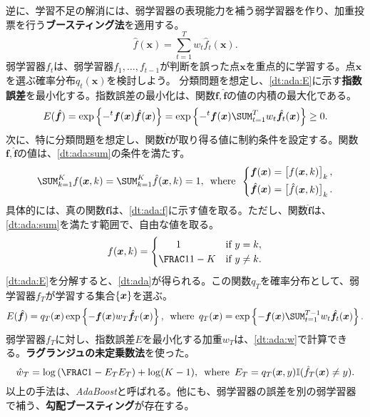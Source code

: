 \documentclass[10pt,a4paper]{book}
\begin{document}
逆に、学習不足の解消には、弱学習器の表現能力を補う弱学習器を作り、加重投票を行う\textbf{ブースティング法}を適用する。
%
\begin{equation}
\hat{f}(\bm{x}) = \sum_{t=1}^T w_t \hat{f}_t(\bm{x}).
\end{equation}
%
弱学習器$f_t$は、弱学習器$f_1,\ldots,f_{t-1}$が判断を誤った点$\bm{x}$を重点的に学習する。点$\bm{x}$を選ぶ確率分布$q_t(\bm{x})$を検討しよう。
分類問題を想定し、\eqref{dt:ada:E}に示す\textbf{指数誤差}を最小化する。指数誤差の最小化は、関数$\bm{f},\hat{\bm{f}}$の値の内積の最大化である。
%
\begin{equation}
\label{eq:dt:ada:E}
E(\hat{\bm{f}}) =
\exp \seq{-\trans{\bm{f}(\bm{x})} \hat{\bm{f}}(\bm{x})} =
\exp \seq{-\trans{\bm{f}(\bm{x})} \sum_{t=1}^T w_t \hat{\bm{f}}_t(\bm{x})} \geq 0.
\end{equation}
%
次に、特に分類問題を想定し、関数$\hat{\bm{f}}$が取り得る値に制約条件を設定する。関数$\bm{f},\hat{\bm{f}}$の値は、\eqref{dt:ada:sum}の条件を満たす。
%
\begin{equation}
\label{eq:dt:ada:sum}
\sum_{k=1}^K f(\bm{x},k) =
\sum_{k=1}^K \hat{f}(\bm{x},k) = 1,
\where
\left\{
\begin{aligned}
\bm{f}(\bm{x}) =
\begin{bmatrix}
f(\bm{x},k)
\end{bmatrix}_k,\\
\hat{\bm{f}}(\bm{x}) =
\begin{bmatrix}
\hat{f}(\bm{x},k)
\end{bmatrix}_k.
\end{aligned}
\right.
\end{equation}
%
具体的には、真の関数$\bm{f}$は、\eqref{dt:ada:f}に示す値を取る。ただし、関数$\hat{\bm{f}}$は、\eqref{dt:ada:sum}を満たす範囲で、自由な値を取る。
%
\begin{equation}
\label{eq:dt:ada:f}
f(\bm{x},k) =
\begin{cases}
\hfil1\hfil& \text{if $y=k$},\\
\frac{1}{1-K}& \text{if $y\neq k$}.
\end{cases}
\end{equation}
%
\eqref{dt:ada:E}を分解すると、\eqref{dt:ada}が得られる。この関数$q_T$を確率分布として、弱学習器$f_T$が学習する集合$\seq{\bm{x}}$を選ぶ。
%
\begin{equation}
\label{eq:dt:ada}
E(\hat{\bm{f}}) =
q_T(\bm{x}) \exp \seq{-\bm{f}(\bm{x}) w_T \hat{\bm{f}}_T(\bm{x})},
\where
q_T(\bm{x}) =
\exp \seq{-\bm{f}(\bm{x}) \sum_{t=1}^{T-1} w_t \hat{\bm{f}}_t(\bm{x})}.
\end{equation}
%
弱学習器$f_T$に対し、指数誤差$E$を最小化する加重$w_T$は、\eqref{dt:ada:w}で計算できる。\textbf{ラグランジュの未定乗数法}を使った。
%
\begin{equation}
\label{eq:dt:ada:w}
\hat{w}_T = \log \tup{\frac{1-E_T}{E_T}} + \log (K-1),
\where
E_T = q_T(\bm{x},y) \mathbb{I}(\hat{f}_T(\bm{x}) \neq y).
\end{equation}
%
以上の手法は、\textit{AdaBoost}と呼ばれる。他にも、弱学習器の誤差を別の弱学習器で補う、\textbf{勾配ブースティング}が存在する。
\end{document}
